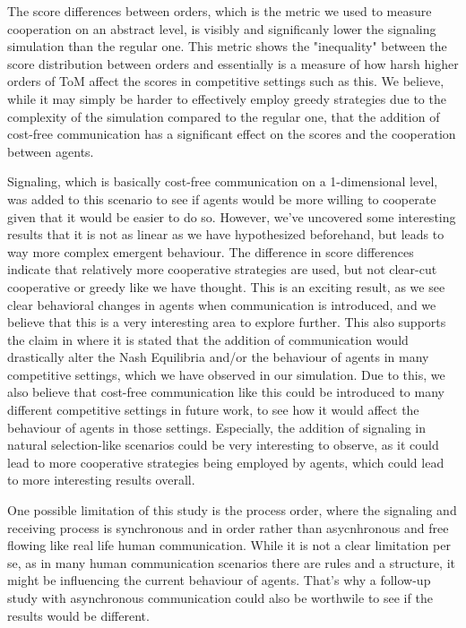 The score differences between orders, which is the metric we used to measure cooperation on an abstract level, is visibly and significanly lower the signaling simulation than the regular one. This metric shows the "inequality" between the score distribution between orders and essentially is a measure of how harsh higher orders of ToM affect the scores in competitive settings such as this. We believe, while it may simply be harder to effectively employ greedy strategies due to the complexity of the simulation compared to the regular one, that the addition of cost-free communication has a significant effect on the scores and the cooperation between agents.

Signaling, which is basically cost-free communication on a 1-dimensional level, was added to this scenario to see if agents would be more willing to cooperate given that it would be easier to do so. However, we've uncovered some interesting results that it is not as linear as we have hypothesized beforehand, but leads to way more complex emergent behaviour. The difference in score differences indicate that relatively more cooperative strategies are used, but not clear-cut cooperative or greedy like we have thought. This is an exciting result, as we see clear behavioral changes in agents when communication is introduced, and we believe that this is a very interesting area to explore further. This also supports the claim in \cite{farrell1996cheap} where it is stated that the addition of communication would drastically alter the Nash Equilibria and/or the behaviour of agents in many competitive settings, which we have observed in our simulation. Due to this, we also believe that cost-free communication like this could be introduced to many different competitive settings in future work, to see how it would affect the behaviour of agents in those settings. Especially, the addition of signaling in natural selection-like scenarios could be very interesting to observe, as it could lead to more cooperative strategies being employed by agents, which could lead to more interesting results overall.

One possible limitation of this study is the process order, where the signaling and receiving process is synchronous and in order rather than asycnhronous and free flowing like real life human communication. While it is not a clear limitation per se, as in many human communication scenarios there are rules and a structure, it might be influencing the current behaviour of agents. That's why a follow-up study with asynchronous communication could also be worthwile to see if the results would be different. 

